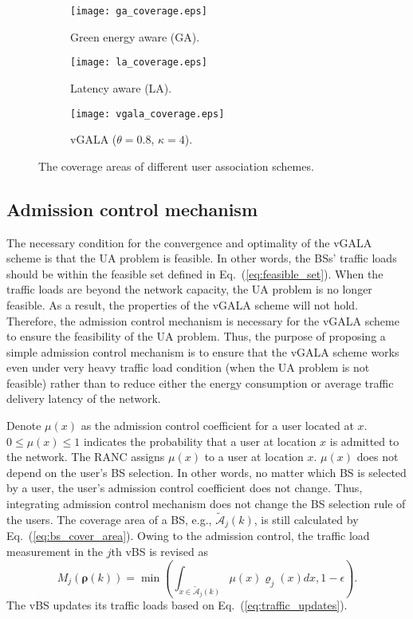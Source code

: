 \documentclass[journal]{IEEEtran}
\theoremstyle{definition}
\begin{document}
\begin{figure*}[ht]
\centering
\hspace*{\fill}
        \begin{subfigure}[b]{0.3\textwidth}
            \texttt{[image: ga\_coverage.eps]}
            \caption{Green energy aware (GA).}
            \label{fig:ga_area}
        \end{subfigure}\hfill
        \begin{subfigure}[b]{0.3\textwidth}
            \texttt{[image: la\_coverage.eps]}
            \caption{Latency aware (LA).}
            \label{fig:la_area}
        \end{subfigure}\hfill
        \begin{subfigure}[b]{0.3\textwidth}
            \texttt{[image: vgala\_coverage.eps]}
            \caption{vGALA ($\theta=0.8$, $\kappa=4$).}
            \label{fig:vgala_area}
        \end{subfigure}\hfill
    \caption{The coverage areas of different user association schemes.
     }\label{fig:sim_1_area_comp}
   \vspace{-16pt}
\end{figure*}

\subsection{Admission control mechanism}
The necessary condition for the convergence and optimality of the vGALA scheme is that the UA problem is feasible. In other words, the BSs' traffic loads should be within the feasible set defined in Eq.~(\ref{eq:feasible_set}). When the traffic loads are beyond the network capacity, the UA problem is no longer feasible. As a result, the properties of the vGALA scheme will not hold. Therefore, the admission control mechanism is necessary for the vGALA scheme to ensure the feasibility of the UA problem. Thus, the purpose of proposing a simple admission control mechanism is to ensure that the vGALA scheme works even under very heavy traffic load condition (when the UA problem is not feasible) rather than to reduce either the energy consumption or average traffic delivery latency of the network.

Denote $\mu(x)$ as the admission control coefficient for a user located at $x$. $0\leq\mu(x)\leq 1$ indicates the probability that a user at location $x$ is admitted to the network. The RANC assigns $\mu(x)$ to a user at location $x$. $\mu(x)$ does not depend on the user's BS selection. In other words, no matter which BS is selected by a user, the user's admission control coefficient does not change. Thus, integrating admission control mechanism does not change the BS selection rule of the users. The coverage area of a BS, e.g., $\mathcal{\tilde{A}}_{j}(k)$, is still calculated by Eq.~(\ref{eq:bs_cover_area}). Owing to the admission control, the traffic load measurement in the $j$th vBS is revised as
\begin{equation}
\label{eq:ad_update_traffic}
M_{j}(\boldsymbol{\rho}(k))=\min{(\int_{x \in \mathcal{\tilde{A}}_{j}(k)}\mu(x)\varrho_{j}(x)dx,1-\epsilon)}.
\end{equation}
The vBS updates its traffic loads based on Eq.~(\ref{eq:traffic_updates}).
\end{document}
